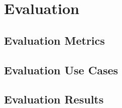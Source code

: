 %
\chapter{Evaluation}

\section{Evaluation Metrics}

\section{Evaluation Use Cases}

\section{Evaluation Results}